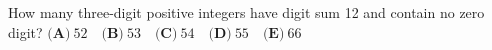 How many three-digit positive integers have digit sum 12 and contain no zero digit? $\textbf{(A)}\ 52\quad\textbf{(B)}\ 53\quad\textbf{(C)}\ 54\quad\textbf{(D)}\ 55\quad\textbf{(E)}\ 66$
